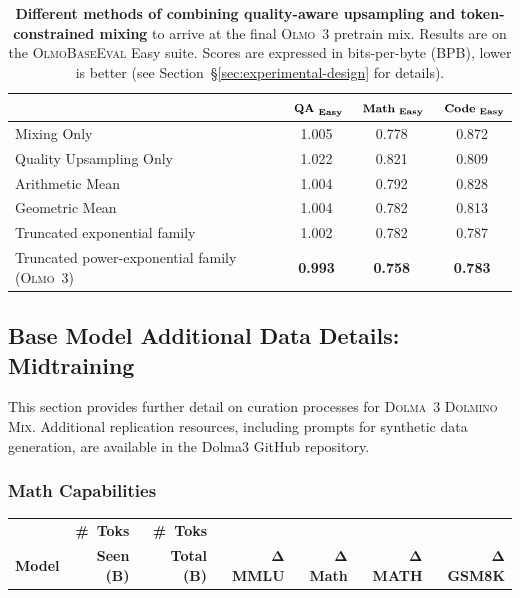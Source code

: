 \documentclass[table]{ai2style/ai2}
\newcommand{\newOlmo}{Olmo\xspace}
\newcommand{\olmothree}{\textsc{\newOlmo~3}\xspace}
\newcommand{\dolminostoo}{\textsc{Dolma~3 Dolmino Mix}\xspace}
\newcommand{\olmothreeeval}{\textsc{OlmoBaseEval}\xspace}
\begin{document}
{{\begin{table}[tbp]
\end{table}

\begin{table}[t]
\centering
\small
\begin{tabular}{@{}l ccc@{}}
\toprule
&
{$\textbf{\fontsize{8}{8}\selectfont~QA}_\textbf{\fontsize{6}{6}\selectfont~Easy}$} &
{$\textbf{\fontsize{8}{8}\selectfont~Math}_\textbf{\fontsize{6}{6}\selectfont~Easy}$} &
{$\textbf{\fontsize{8}{8}\selectfont~Code}_\textbf{\fontsize{6}{6}\selectfont~Easy}$} \\
\midrule
\rowcolor{lightgrey} Mixing Only             & 1.005 & 0.778 & 0.872 \\
\rowcolor{lightgrey} Quality Upsampling Only & 1.022 & 0.821 & 0.809 \\
\rowcolor{lightgrey} Arithmetic Mean         & 1.004 & 0.792 & 0.828 \\
\rowcolor{lightgrey} Geometric Mean          & 1.004 & 0.782 & 0.813 \\
\rowcolor{lightgrey} Truncated exponential family         & 1.002 & 0.782 & 0.787 \\
\rowcolor{ai2lightpink} Truncated power-exponential family (\olmothree) & {\bf{0.993}} & {\bf{0.758}} & {\bf{0.783}} \\
\bottomrule
\end{tabular}
\caption{
\textbf{Different methods of combining quality-aware upsampling and token-constrained mixing} to arrive at the final \olmothree pretrain mix. Results are on the \olmothreeeval Easy suite. Scores are expressed in bits-per-byte (BPB), lower is better (see Section~\S\ref{sec:experimental-design} for details).
}
\label{tab:resolving-upsampling-mixing}
\end{table}

\subsection{Base Model Additional Data Details: Midtraining}\label{app:sec:midtraining-data}

This section provides further detail on curation processes for \dolminostoo. Additional replication resources, including prompts for synthetic data generation, are available in the Dolma3 GitHub repository.

\subsubsection{Math Capabilities}
\begin{table}[t]
\centering
\begin{tabular}{lrrrrrr}
\toprule
 & {\bf\#~Toks} & ~{\bf\#~Toks} & & & & \\
 {\bf Model} & {\bf Seen (B)} & ~{\bf Total (B)} & {\bf$\mathbf{\Delta}$~MMLU} & {\bf$\mathbf{\Delta}$~Math} & {\bf$\mathbf{\Delta}$~MATH} & {\bf$\mathbf{\Delta}$~GSM8K}\\


\end{tabular}
\end{table}}}
\end{document}
